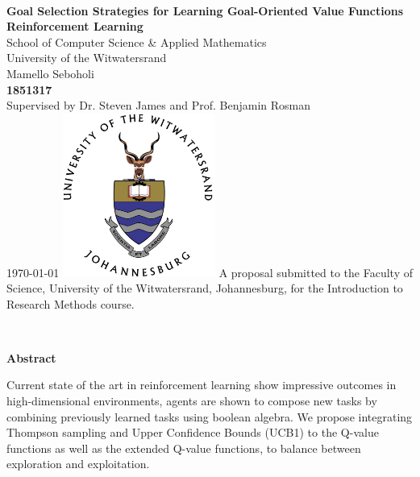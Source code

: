 \documentclass[a4paper,twoside,12pt]{report}
\renewenvironment{abstract}{\ \vfill\begin{center}\textbf{Abstract}\end{center}\addcontentsline{toc}{section}{Abstract}}{\vfill\vfill\newpage}
\begin{document}
\onecolumn
\thispagestyle{empty}

\setcounter{page}{0}
\
\begin{center}
  \vfill
  \huge \textbf{Goal Selection Strategies for Learning Goal-Oriented Value Functions}\\[5pt]
  \LARGE \textbf{Reinforcement Learning}\\[20pt]
  \large School of Computer Science \& Applied Mathematics\\
  \large University of the Witwatersrand\\[20pt]
  \large Mamello Seboholi\\
  \large \textbf{1851317}\\[20pt]
  \large Supervised by Dr. Steven James and Prof. Benjamin Rosman\\[10pt]
  \today
  \vfill
  \includegraphics[width=5cm]{images/wits-logo.png}
  \vfill
  \normalsize A proposal submitted to the Faculty of Science, University of the Witwatersrand, Johannesburg, for the 
  Introduction to Research Methods course.
  \vfill
\end{center}
\newpage

\pagestyle{plain}
\setcounter{page}{1}

\begin{abstract}
Current state of the art in reinforcement learning show impressive outcomes in high-dimensional environments, agents 
are shown to compose new tasks by combining previously learned tasks using boolean algebra. We propose integrating 
Thompson sampling and Upper Confidence Bounds (UCB1) to the Q-value functions as well as the extended Q-value functions, 
to balance between exploration and exploitation.
\end{abstract}

{}


{}
\tableofcontents
\newpage
\end{document}
